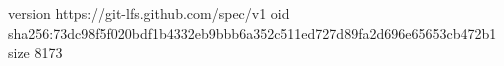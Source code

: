 version https://git-lfs.github.com/spec/v1
oid sha256:73dc98f5f020bdf1b4332eb9bbb6a352c511ed727d89fa2d696e65653cb472b1
size 8173
